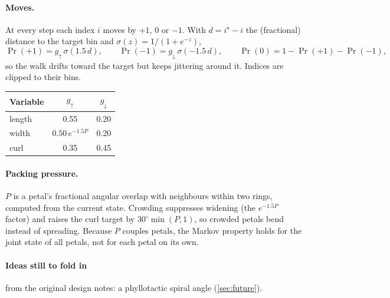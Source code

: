 \paragraph{Moves.} At every step each index $i$ moves by $+1$, $0$ or $-1$.
With $d = i^\star - i$ the (fractional) distance to the target bin and
$\sigma(z) = 1/(1+e^{-z})$,
\[
  \Pr(+1) = g_\uparrow\,\sigma(1.5\,d), \qquad
  \Pr(-1) = g_\downarrow\,\sigma(-1.5\,d), \qquad
  \Pr(0) = 1 - \Pr(+1) - \Pr(-1),
\]
so the walk drifts toward the target but keeps jittering around it. Indices are
clipped to their bins.
\begin{center}\small
\begin{tabular}{@{}lcc@{}}
\toprule
Variable & $g_\uparrow$ & $g_\downarrow$ \\
\midrule
length & 0.55 & 0.20 \\
width & $0.50\,e^{-1.5P}$ & 0.20 \\
curl & 0.35 & 0.45 \\
\bottomrule
\end{tabular}
\end{center}

\paragraph{Packing pressure.} $P$ is a petal's fractional angular overlap with
neighbours within two rings, computed from the current state. Crowding
suppresses widening (the $e^{-1.5P}$ factor) and raises the curl target by
$30^\circ\min(P,1)$, so crowded petals bend instead of spreading. Because $P$
couples petals, the Markov property holds for the joint state of all petals,
not for each petal on its own.


\paragraph{Ideas still to fold in} from the original design notes: a
phyllotactic spiral angle (\cref{sec:future}).
